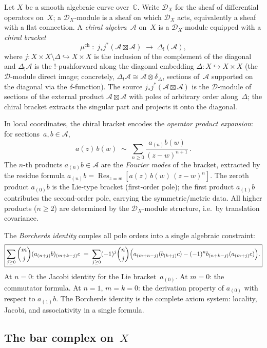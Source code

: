 \documentclass[11pt]{report}
\theoremstyle{definition}
\theoremstyle{remark}
\providecommand{\cA}{\mathcal{A}}
\numberwithin{equation}{section}
\begin{document}
Let $X$ be a smooth algebraic curve over~$\mathbb C$. Write
$\mathcal D_X$ for the sheaf of differential operators on~$X$; a
$\mathcal D_X$-module is a sheaf on which $\mathcal D_X$ acts,
equivalently a sheaf with a flat connection.
A \emph{chiral algebra}~$\cA$ on~$X$ is a $\mathcal D_X$-module
equipped with a \emph{chiral bracket}
\[
\mu^{\mathrm{ch}}
\;\colon\;
j_*j^*(\cA\boxtimes\cA)
\;\longrightarrow\;
\Delta_!(\cA),
\]
where $j\colon X\times X\setminus\Delta
\hookrightarrow X\times X$ is the inclusion of the
complement of the diagonal and
$\Delta_!\cA$ is the $!$-pushforward along the diagonal
embedding $\Delta\colon X\hookrightarrow X\times X$
(the $\mathcal{D}$-module direct image; concretely,
$\Delta_!\cA \cong \cA \otimes \delta_\Delta$, sections
of~$\cA$ supported on the diagonal via the
$\delta$-function). The source
$j_*j^*(\cA\boxtimes\cA)$ is the $\mathcal{D}$-module
of sections of the external product
$\cA \boxtimes \cA$ with poles of arbitrary order
along~$\Delta$; the chiral bracket extracts the
singular part and projects it onto the diagonal.

In local coordinates, the chiral bracket encodes the \emph{operator
product expansion}: for sections~$a,b\in\cA$,
\[
a(z)\,b(w)
\;\sim\;
\sum_{n\ge 0}\frac{a_{(n)}b(w)}{(z-w)^{n+1}}\,.
\]
The $n$-th products $a_{(n)}b\in\cA$ are the
\emph{Fourier modes} of the bracket, extracted by the
residue formula
$a_{(n)}b = \operatorname{Res}_{z=w}
[a(z)\,b(w)\,(z{-}w)^n]$.
The zeroth product $a_{(0)}b$ is the Lie-type
bracket (first-order pole); the first product $a_{(1)}b$
contributes the second-order pole, carrying the
symmetric/metric data. All higher products ($n\ge 2$)
are determined by the $\mathcal D_X$-module structure,
i.e.\ by translation covariance.

The \emph{Borcherds identity} couples all pole orders into a single
algebraic constraint:
\[
\boxed{
\sum_{j\ge 0}\binom{m}{j}(a_{(n+j)}b)_{(m+k-j)}c
\;=\;
\sum_{j\ge 0}(-1)^j\binom{n}{j}
\Bigl(
a_{(m+n-j)}(b_{(k+j)}c)
-(-1)^n b_{(n+k-j)}(a_{(m+j)}c)
\Bigr).
}
\]
At $n=0$: the Jacobi identity for the Lie bracket~$a_{(0)}$.
At $m=0$: the commutator formula. At $n=1$, $m=k=0$:
the derivation property of $a_{(0)}$ with respect to $a_{(1)}b$.
The Borcherds identity is the complete axiom system: locality,
Jacobi, and associativity in a single formula.

\subsection*{The bar complex on~$X$}
\end{document}
